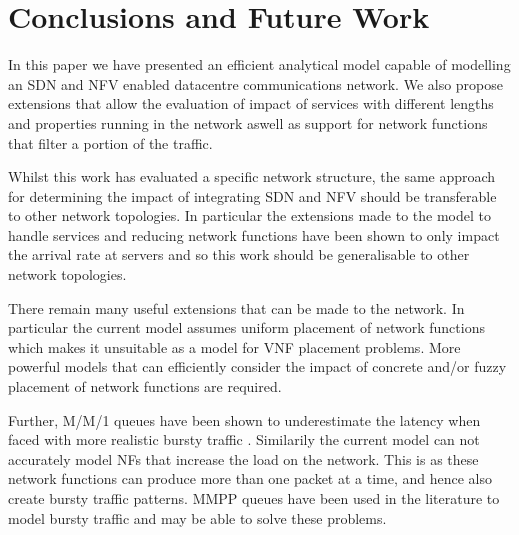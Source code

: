 
\section{Conclusions and Future Work}
\label{sec:conclusions}
In this paper we have presented an efficient analytical model capable of modelling an SDN and NFV enabled datacentre communications network. We also propose extensions that allow the evaluation of impact of services with different lengths and properties running in the network aswell as support for network functions that filter a portion of the traffic. 

Whilst this work has evaluated a specific network structure, the same approach for determining the impact of integrating SDN and NFV should be transferable to other network topologies. In particular the extensions made to the model to handle services and reducing network functions have been shown to only impact the arrival rate at servers and so this work should be generalisable to other network topologies.

There remain many useful extensions that can be made to the network. In particular the current model assumes uniform placement of network functions which makes it unsuitable as a model for VNF placement problems. More powerful models that can efficiently consider the impact of concrete and/or fuzzy placement of network functions are required.

Further, M/M/1 queues have been shown to underestimate the latency when faced with more realistic bursty traffic \cite{WuMLJ12}. Similarily the current model can not accurately model NFs that increase the load on the network. This is as these network functions can produce more than one packet at a time, and hence also create bursty traffic patterns. MMPP queues have been used in the literature to model bursty traffic \cite{MiaoMWWH16, WuMLJ12} and may be able to solve these problems.